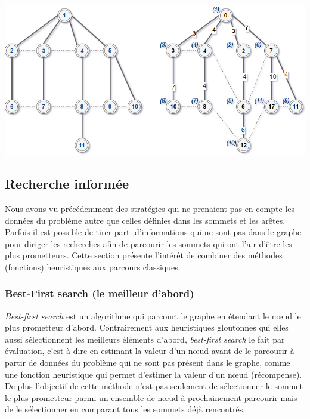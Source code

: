 \begin{center}
    \includegraphics[scale=0.5]{../ressources/images/breath_first_search.png}
\end{center}

\subsection{Recherche informée}
Nous avons vu précédemment des stratégies qui ne prenaient pas en compte les données du problème autre que celles définies dans les sommets et les arêtes. Parfois il est possible de tirer parti d'informations qui ne sont pas dans le graphe pour diriger les recherches afin de parcourir les sommets qui ont l'air d'être les plus prometteurs.
Cette section présente l'intérêt de combiner des méthodes (fonctions) heuristiques aux parcours classiques.

\subsubsection{Best-First search (le meilleur d'abord)}
\textit{Best-first search} est un algorithme qui parcourt le graphe en étendant le nœud le plus prometteur d'abord. Contrairement aux heuristiques gloutonnes qui elles aussi sélectionnent les meilleurs éléments d'abord, \textit{best-first search} le fait par évaluation, c'est à dire en estimant la valeur d'un nœud avant de le parcourir à partir de données du problème qui ne sont pas présent dans le graphe, comme une fonction heuristique qui permet d'estimer la valeur d'un nœud (récompense). De plus l'objectif de cette méthode n'est pas seulement de sélectionner le sommet le plus prometteur parmi un ensemble de nœud à prochainement parcourir mais de le sélectionner en comparant tous les sommets déjà rencontrés.

